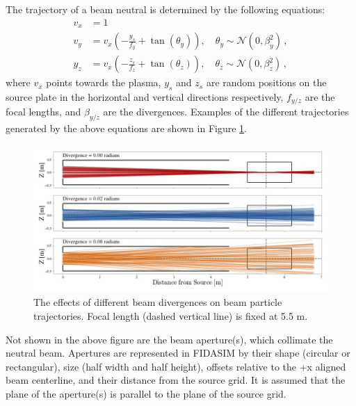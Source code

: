 The trajectory of a beam neutral is determined by the following equations:
\begin{equation}\label{eq:beam_trajectory}
    \begin{split}
        v_x &= 1  \\
        v_y &= v_x\left(-\frac{y_s}{f_y} + \tan(\theta_y)\right),\quad \theta_y \sim \mathcal{N}(0,\beta_y^2) \,,\\
        y_z &= v_x\left(-\frac{z_s}{f_z} + \tan(\theta_z)\right),\quad \theta_z \sim \mathcal{N}(0,\beta_z^2)\,,
    \end{split}
\end{equation}
where $v_x$ points towards the plasma, $y_s$ and $z_s$ are random positions on the source plate in the horizontal and vertical directions respectively, $f_{y/z}$ are the focal lengths, and $\beta_{y/z}$ are the divergences. Examples of the different trajectories generated by the above equations are shown in Figure \ref{fig:beam_divergence}.
\begin{figure}[ht]
    \centering
    \includegraphics[width=15cm]{figures/beam_divergence.jpg}
    \caption{The effects of different beam divergences on beam particle trajectories. Focal length (dashed vertical line) is fixed at 5.5 m.}
    \label{fig:beam_divergence}
\end{figure}
Not shown in the above figure are the beam aperture(s), which collimate the neutral beam. Apertures are represented in FIDASIM by their shape (circular or rectangular), size (half width and half height), offsets relative to the +x aligned beam centerline, and their distance from the source grid. It is assumed that the plane of the aperture(s) is parallel to the plane of the source grid.


